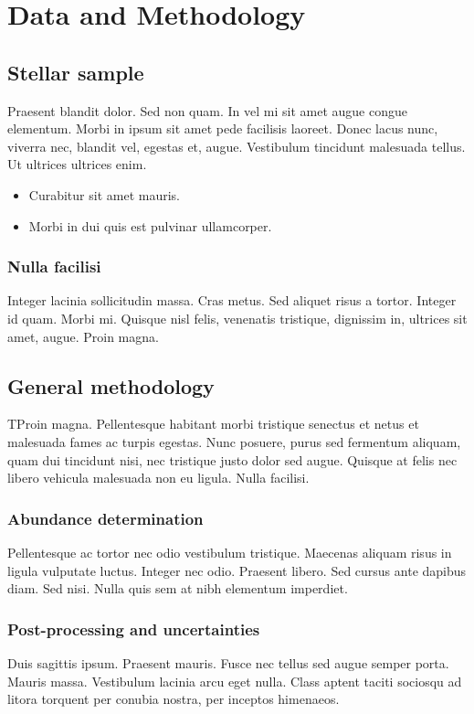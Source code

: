 
\chapter{Data and Methodology}
\label{chap: methodology}

\section{Stellar sample}
Praesent blandit dolor. Sed non quam. In vel mi sit amet augue congue elementum. Morbi in ipsum sit amet pede facilisis laoreet. Donec lacus nunc, viverra nec, blandit vel, egestas et, augue. Vestibulum tincidunt malesuada tellus. Ut ultrices ultrices enim.

\newpage

\begin{itemize}
    \item Curabitur sit amet mauris.
    \item Morbi in dui quis est pulvinar ullamcorper.
\end{itemize}

\subsection{Nulla facilisi}
Integer lacinia sollicitudin massa. Cras metus. Sed aliquet risus a tortor. Integer id quam. Morbi mi. Quisque nisl felis, venenatis tristique, dignissim in, ultrices sit amet, augue. Proin magna.

\section{General methodology}
\label{sec: method}
TProin magna. Pellentesque habitant morbi tristique senectus et netus et malesuada fames ac turpis egestas. Nunc posuere, purus sed fermentum aliquam, quam dui tincidunt nisi, nec tristique justo dolor sed augue. Quisque at felis nec libero vehicula malesuada non eu ligula. Nulla facilisi.

\subsection{Abundance determination}
\label{sec: specific method}
Pellentesque ac tortor nec odio vestibulum tristique. Maecenas aliquam risus in ligula vulputate luctus. Integer nec odio. Praesent libero. Sed cursus ante dapibus diam. Sed nisi. Nulla quis sem at nibh elementum imperdiet.

\subsection{Post-processing and uncertainties}
Duis sagittis ipsum. Praesent mauris. Fusce nec tellus sed augue semper porta. Mauris massa. Vestibulum lacinia arcu eget nulla. Class aptent taciti sociosqu ad litora torquent per conubia nostra, per inceptos himenaeos.
